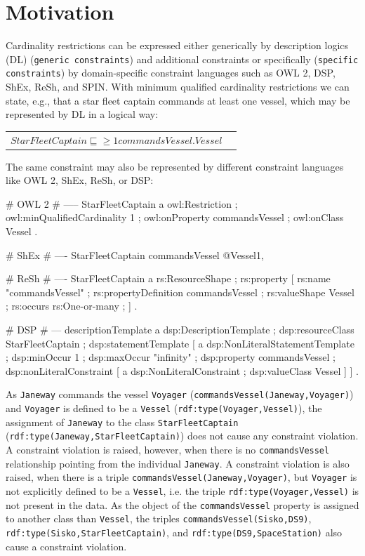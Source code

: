 \documentclass{llncs}
\newcommand{\ms}[1]{\texttt{#1}}
\newenvironment{DL}{
	\begin{center}
  \begin{tabular}{r l}

}{
  \end{tabular}
	\end{center}
}
\begin{document}
\section{Motivation}

Cardinality restrictions can be expressed either generically by description logics (DL) (\ms{generic constraints}) and additional constraints or specifically (\ms{specific constraints}) by domain-specific constraint languages such as OWL 2, DSP, ShEx, ReSh, and SPIN.
With minimum qualified cardinality restrictions we can state, e.g., that a star fleet captain commands at least one vessel, which may be represented by DL in a logical way:

\begin{DL}
$StarFleetCaptain \sqsubseteq \geq1 commandsVessel . Vessel $
\end{DL}

The same constraint may also be represented by different constraint languages like OWL 2, ShEx, ReSh, or DSP:

\begin{ex}
# OWL 2
# -----
StarFleetCaptain
    a owl:Restriction ;
    owl:minQualifiedCardinality 1 ;
    owl:onProperty commandsVessel ;
    owl:onClass Vessel .
		
# ShEx
# ----
StarFleetCaptain { commandsVessel @Vessel{1, } }

# ReSh
# ----
StarFleetCaptain a rs:ResourceShape ; rs:property [
    rs:name "commandsVessel" ; rs:propertyDefinition commandsVessel ;
    rs:valueShape Vessel ;
    rs:occurs rs:One-or-many ; ] .
				
# DSP
# ---			
descriptionTemplate a dsp:DescriptionTemplate ; 
    dsp:resourceClass StarFleetCaptain ; 
    dsp:statementTemplate [ a dsp:NonLiteralStatementTemplate ;
        dsp:minOccur 1 ; dsp:maxOccur "infinity" ; 
        dsp:property commandsVessel ; 
        dsp:nonLiteralConstraint [ a dsp:NonLiteralConstraint ;
            dsp:valueClass Vessel ] ] .
\end{ex}

As \ms{Janeway} commands the vessel \ms{Voyager} (\ms{commandsVessel(Janeway,Voyager)}) and \ms{Voyager} is defined to be a \ms{Vessel} (\ms{rdf:type(Voyager,Vessel)}), the assignment of \ms{Janeway} to the class \ms{StarFleetCaptain} (\ms{rdf:type(Janeway,StarFleetCaptain)}) does not cause any constraint violation.
A constraint violation is raised, however, when there is no \ms{commandsVessel} relationship pointing from the individual \ms{Janeway}. 
A constraint violation is also raised, when there is a triple \ms{commandsVessel(Janeway,Voyager)}, but \ms{Voyager} is not explicitly defined to be a \ms{Vessel}, 
i.e. the triple \ms{rdf:type(Voyager,Vessel)} is not present in the data. 
As the object of the \ms{commandsVessel} property is assigned to another class than \ms{Vessel}, 
the triples \ms{commandsVessel(Sisko,DS9)}, \ms{rdf:type(Sisko,StarFleetCaptain)}, and \ms{rdf:type(DS9,SpaceStation)}  
also cause a constraint violation.
\end{document}
